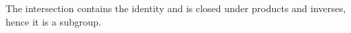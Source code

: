 The intersection contains the identity and is closed under products and inverses,
hence it is a subgroup.

